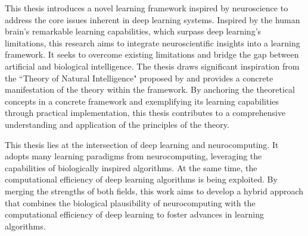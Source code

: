 This thesis introduces a novel learning framework inspired by neuroscience to address the core issues inherent in deep learning systems. Inspired by the human brain's remarkable learning capabilities, which surpass deep learning's limitations, this research aims to integrate neuroscientific insights into a learning framework. It seeks to overcome existing limitations and bridge the gap between artificial and biological intelligence. The thesis draws significant inspiration from the ``Theory of Natural Intelligence" proposed by   \citeauthor*{von_der_malsburg_theory_2022} \citeauthor{von_der_malsburg_theory_2022} and provides a concrete manifestation of the theory within the framework. By anchoring the theoretical concepts in a concrete framework and exemplifying its learning capabilities through practical implementation, this thesis contributes to a comprehensive understanding and application of the principles of the theory.

This thesis lies at the intersection of deep learning and neurocomputing. It adopts many learning paradigms from neurocomputing, leveraging the capabilities of biologically inspired algorithms. At the same time, the computational efficiency of deep learning algorithms is being exploited. By merging the strengths of both fields, this work aims to develop a hybrid approach that combines the biological plausibility of neurocomputing with the computational efficiency of deep learning to foster advances in learning algorithms.


